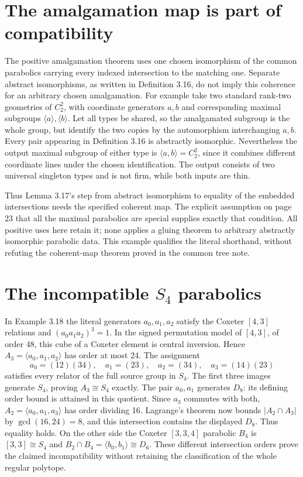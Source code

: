 \section{The amalgamation map is part of compatibility}
The positive amalgamation theorem uses one chosen isomorphism of the
common parabolics carrying every indexed intersection to the matching
one. Separate abstract isomorphisms, as written in Definition 3.16,
do not imply this coherence for an arbitrary chosen amalgamation.
For example take two standard rank-two geometries of $C_2^2$, with
coordinate generators $a,b$ and corresponding maximal subgroups
$\langle a\rangle,\langle b\rangle$. Let all types be shared, so
the amalgamated subgroup is the whole group, but identify the two
copies by the automorphism interchanging $a,b$. Every pair appearing
in Definition 3.16 is abstractly isomorphic. Nevertheless the output
maximal subgroup of either type is
$\langle a,b\rangle=C_2^2$, since it combines different coordinate
lines under the chosen identification. The output consists of two
universal singleton types and is not firm, while both inputs are thin.

Thus Lemma 3.17's step from abstract isomorphism to equality of the
embedded intersections needs the specified coherent map. The explicit
assumption on page 23 that all the maximal parabolics are special
supplies exactly that condition. All positive uses here retain it;
none applies a gluing theorem to arbitrary abstractly isomorphic
parabolic data. This example qualifies the literal shorthand, without
refuting the coherent-map theorem proved in the common tree note.

\section{The incompatible $S_4$ parabolics}
In Example 3.18 the literal generators $a_0,a_1,a_2$ satisfy the
Coxeter $[4,3]$ relations and $(a_0a_1a_2)^3=1$. In the signed
permutation model of $[4,3]$, of order 48, this cube of a Coxeter
element is central inversion. Hence $A_3=\langle a_0,a_1,a_2\rangle$
has order at most 24. The assignment
\[
 a_0=(12)(34),\quad a_1=(23),\quad a_2=(34),\quad a_3=(14)(23)
\]
satisfies every relator of the full source group in $S_4$. The first
three images generate $S_4$, proving $A_3\cong S_4$ exactly.
The pair $a_0,a_1$ generates $D_8$: its defining order bound is
attained in this quotient. Since $a_3$ commutes with both,
$A_2=\langle a_0,a_1,a_3\rangle$ has order dividing 16.
Lagrange's theorem now bounds $|A_2\cap A_3|$ by
$\gcd(16,24)=8$, and this intersection contains the displayed
$D_8$. Thus equality holds. On the other side the Coxeter $[3,3,4]$
parabolic $B_4$ is $[3,3]\cong S_4$ and
$B_2\cap B_4=\langle b_0,b_1\rangle\cong D_6$.
These different intersection orders prove the claimed incompatibility
without retaining the classification of the whole regular polytope.

